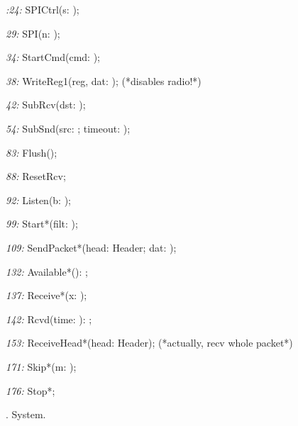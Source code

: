 \item{\it :24:} SPICtrl(s: \SET);
\item{\it 29:} SPI(n: \INTEGER);
\item{\it 34:} StartCmd(cmd: \INTEGER);
\item{\it 38:} WriteReg1(reg, dat: \INTEGER);  (*disables radio!*)
\item{\it 42:} SubRcv(dst: \INTEGER);
\item{\it 54:} SubSnd(src: \INTEGER; \VAR timeout: \BOOLEAN);
\item{\it 83:} Flush();
\item{\it 88:} ResetRcv;
\item{\it 92:} Listen(b: \BOOLEAN);
\item{\it 99:} Start*(filt: \BOOLEAN);
\item{\it 109:} SendPacket*(\VAR head: Header; dat: \ARRAYOF \BYTE);
\item{\it 132:} Available*(): \INTEGER;
\item{\it 137:} Receive*(\VAR x: \BYTE);
\item{\it 142:} Rcvd(time: \INTEGER): \BOOLEAN;
\item{\it 153:} ReceiveHead*(\VAR head: Header);  (*actually, recv whole packet*)
\item{\it 171:} Skip*(m: \INTEGER);
\item{\it 176:} Stop*;

. System.


